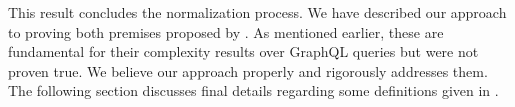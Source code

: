 This result concludes the normalization process. We have described our approach to proving both premises proposed by \HP{}. As mentioned earlier, these are fundamental for their complexity results over GraphQL queries but were not proven true. We believe our approach properly and rigorously addresses them. The following section discusses final details regarding some definitions given in \HP{}.
